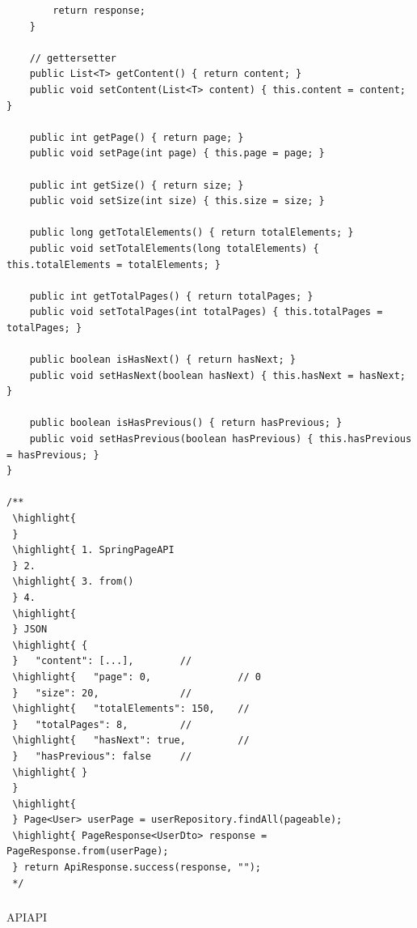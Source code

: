 \begin{lstlisting}
        return response;
    }
    
    // gettersetter
    public List<T> getContent() { return content; }
    public void setContent(List<T> content) { this.content = content; }
    
    public int getPage() { return page; }
    public void setPage(int page) { this.page = page; }
    
    public int getSize() { return size; }
    public void setSize(int size) { this.size = size; }
    
    public long getTotalElements() { return totalElements; }
    public void setTotalElements(long totalElements) { this.totalElements = totalElements; }
    
    public int getTotalPages() { return totalPages; }
    public void setTotalPages(int totalPages) { this.totalPages = totalPages; }
    
    public boolean isHasNext() { return hasNext; }
    public void setHasNext(boolean hasNext) { this.hasNext = hasNext; }
    
    public boolean isHasPrevious() { return hasPrevious; }
    public void setHasPrevious(boolean hasPrevious) { this.hasPrevious = hasPrevious; }
}

/**
 \highlight{ 
 } 
 \highlight{ 1. SpringPageAPI
 } 2. 
 \highlight{ 3. from()
 } 4. 
 \highlight{ 
 } JSON
 \highlight{ {
 }   "content": [...],        // 
 \highlight{   "page": 0,               // 0
 }   "size": 20,              // 
 \highlight{   "totalElements": 150,    // 
 }   "totalPages": 8,         // 
 \highlight{   "hasNext": true,         // 
 }   "hasPrevious": false     // 
 \highlight{ }
 } 
 \highlight{ 
 } Page<User> userPage = userRepository.findAll(pageable);
 \highlight{ PageResponse<UserDto> response = PageResponse.from(userPage);
 } return ApiResponse.success(response, "");
 */
\end{lstlisting}

\hypertarget{section-72}{%
\subsubsection{}\label{section-72}}

APIAPI


